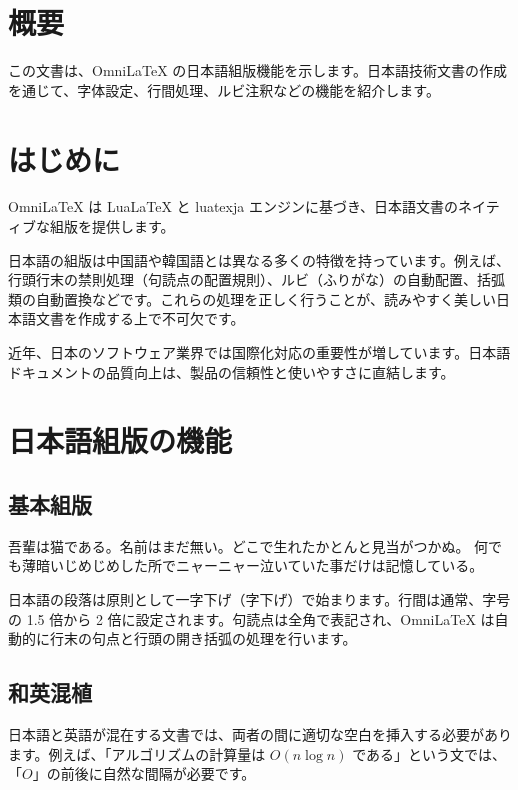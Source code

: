 \documentclass[
    language=japanese,
    doctype=article,
    institution=none,
]{../../omnilatex}
\begin{document}
\maketitle

\section*{概要}
この文書は、OmniLaTeX の日本語組版機能を示します。日本語技術文書の作成を通じて、字体設定、行間処理、ルビ注釈などの機能を紹介します。

\tableofcontents

\section{はじめに}
OmniLaTeX は LuaLaTeX と luatexja エンジンに基づき、日本語文書のネイティブな組版を提供します。

日本語の組版は中国語や韓国語とは異なる多くの特徴を持っています。例えば、行頭行末の禁則処理（句読点の配置規則）、ルビ（ふりがな）の自動配置、括弧類の自動置換などです。これらの処理を正しく行うことが、読みやすく美しい日本語文書を作成する上で不可欠です。

近年、日本のソフトウェア業界では国際化対応の重要性が増しています。日本語ドキュメントの品質向上は、製品の信頼性と使いやすさに直結します。

\section{日本語組版の機能}

\subsection{基本組版}
吾輩は猫である。名前はまだ無い。どこで生れたかとんと見当がつかぬ。
何でも薄暗いじめじめした所でニャーニャー泣いていた事だけは記憶している。

日本語の段落は原則として一字下げ（字下げ）で始まります。行間は通常、字号の 1.5 倍から 2 倍に設定されます。句読点は全角で表記され、OmniLaTeX は自動的に行末の句点と行頭の開き括弧の処理を行います。

\subsection{和英混植}
日本語と英語が混在する文書では、両者の間に適切な空白を挿入する必要があります。例えば、「アルゴリズムの計算量は $O(n \log n)$ である」という文では、「$O$」の前後に自然な間隔が必要です。
\end{document}
